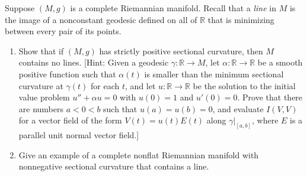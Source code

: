 \begin{exercise}\label{prob:complete-lines-sectional-curvature}
Suppose $(M, g)$ is a complete Riemannian manifold. Recall that a \emph{line} in $M$ is the image of a nonconstant geodesic defined on all of $\mathbb{R}$ that is minimizing between every pair of its points.

\begin{enumerate}[label=(\alph*)]
\item Show that if $(M, g)$ has strictly positive sectional curvature, then $M$ contains no lines. [Hint: Given a geodesic $\gamma : \mathbb{R} \to M$, let $\alpha : \mathbb{R} \to \mathbb{R}$ be a smooth positive function such that $\alpha(t)$ is smaller than the minimum sectional curvature at $\gamma(t)$ for each $t$, and let $u : \mathbb{R} \to \mathbb{R}$ be the solution to the initial value problem $u'' + \alpha u = 0$ with $u(0) = 1$ and $u'(0) = 0$. Prove that there are numbers $a < 0 < b$ such that $u(a) = u(b) = 0$, and evaluate $I(V, V)$ for a vector field of the form $V(t) = u(t)E(t)$ along $\gamma|_{[a,b]}$, where $E$ is a parallel unit normal vector field.]
\item Give an example of a complete nonflat Riemannian manifold with nonnegative sectional curvature that contains a line.
\end{enumerate}
\end{exercise}
